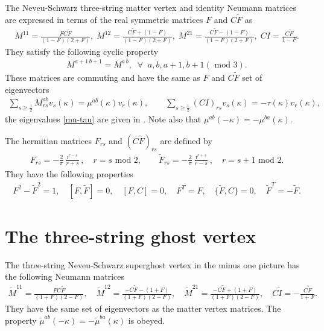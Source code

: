 \documentclass[a4paper,12pt]{article}
\begin{document}
The Neveu-Schwarz three-string matter
vertex and identity Neumann matrices are expressed
in terms of the
real symmetric matrices
$F$ and $C\tilde{F}$ as \cite{GJ3}
\begin{gather}
M^{11}=\frac{FC\tilde{F}}{(1-F)(2+F)},\;
M^{12}=\frac{C\tilde{F}+(1-F)}{(1-F)(2+F)},\;
M^{21}=\frac{C\tilde{F}-(1-F)}{(1-F)(2+F)},\;
CI=\frac{C\tilde{F}}{1-F}.
\end{gather}
They satisfy the following cyclic property
\begin{gather}
M^{a+1\,b+1}=M^{a\,b},\;\;
\forall \;\;a,b,a+1,b+1(\text{ mod } 3).
\end{gather}
These matrices are commuting and have the same as $F$ and $C\tilde{F}$
set of eigenvectors
\begin{gather}
\sum_{s\geq\tfrac12}M^{ab}_{rs}v_{s}(\kappa)
=\mu^{ab}(\kappa)v_{r}(\kappa),\qquad
\sum_{s\geq\tfrac12}(CI)_{rs}v_{s}(\kappa)
=-\tau(\kappa)v_{r}(\kappa),
\label{eigen-eq}
\end{gather}
the eigenvalues \eqref{mu-tau} are given in \cite{0112231}.
Note also that $\mu^{ab}(-\kappa)=-\mu^{ba}(\kappa)$.

The hermitian matrices $F_{rs}$ and
$(C\tilde{F})_{rs}$ are defined by
\begin{gather}
F_{rs}=-\frac{2}{\pi}\frac{\imath^{r-s}}{r+s},\quad
r=s\text{ mod }2,\qquad
\tilde{F}_{rs}=-\frac{2}{\pi}\frac{\imath^{r+s}}{r-s},\quad
r=s+1\text{ mod }2.
\end{gather}
They have the following properties
\begin{gather}
F^{2}-\tilde{F}^{2}=1,\quad [F,\tilde{F}]=0,\quad
[F,C]=0,\quad F^{T}=F,\quad \{\tilde{F},C\}=0,\quad
\tilde{F}^{T}=-\tilde{F}.
\end{gather}



\section{The three-string ghost vertex}
\setcounter{equation}{0}

The three-string Neveu-Schwarz superghost vertex
in the minus one picture has the following Neumann matrices
\begin{gather}
\tilde{M}^{11}=\frac{FC\tilde{F}}{(1+F)(2-F)},\quad
\tilde{M}^{12}=\frac{-C\tilde{F}-(1+F)}{(1+F)(2-F)},\quad
\tilde{M}^{21}=\frac{-C\tilde{F}+(1+F)}{(1+F)(2-F)},\quad
C\tilde{I}=-\frac{C\tilde{F}}{1+F}.
\end{gather}
They have the same set of eigenvectors as the matter vertex matrices.
The property $\tilde{\mu}^{ab}(-\kappa)=-\tilde{\mu}^{ba}(\kappa)$ is obeyed.
\end{document}

